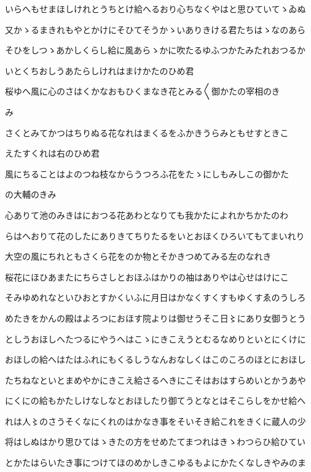 \documentclass[a4paper,11pt,landscape]{ltjtarticle}
\begin{document}
いらへもせまほしけれとうちとけ給へるおり心ちなくやはと思ひていてゝゐぬ
\par\medskip
又かゝるまきれもやとかけにそひてそうかゝいありきける君たちはゝなのあら
\par\medskip
そひをしつゝあかしくらし給に風あらゝかに吹たるゆふつかたみたれおつるか
\par\medskip
いとくちおしうあたらしけれはまけかたのひめ君
\par\medskip
桜ゆへ風に心のさはくかなおもひくまなき花とみる〱御かたの宰相のき
\par\medskip
み
\par\medskip
さくとみてかつはちりぬる花なれはまくるをふかきうらみともせすときこ
\par\medskip
えたすくれは右のひめ君
\par\medskip
風にちることはよのつね枝なからうつろふ花をたゝにしもみしこの御かた
\par\medskip
の大輔のきみ
\par\medskip
心ありて池のみきはにおつる花あわとなりても我かたによれかちかたのわ
\par\medskip
らはへおりて花のしたにありきてちりたるをいとおほくひろいてもてまいれり
\par\medskip
大空の風にちれともさくら花をのか物とそかきつめてみる左のなれき
\par\medskip
桜花にほひあまたにちらさしとおほふはかりの袖はありやは心せはけにこ
\par\medskip
そみゆめれなといひおとすかくいふに月日はかなくすくすもゆくすゑのうしろ
\par\medskip
めたきをかんの殿はよろつにおほす院よりは御せうそこ日〻にあり女御うとう
\par\medskip
としうおほしへたつるにやうへはこゝにきこえうとむるなめりといとにくけに
\par\medskip
おほしの給へはたはふれにもくるしうなんおなしくはこのころのほとにおほし
\par\medskip
たちねなといとまめやかにきこえ給さるへきにこそはおはすらめいとかうあや
\par\medskip
にくにの給もかたしけなしなとおほしたり御てうとなとはそこらしをかせ給へ
\par\medskip
れは人〻のさうそくなにくれのはかなき事をそいそき給これをきくに蔵人の少
\par\medskip
将はしぬはかり思ひてはゝきたの方をせめたてまつれはきゝわつらひ給ひてい
\par\medskip
とかたはらいたき事につけてほのめかしきこゆるもよにかたくなしきやみのま
\par\medskip
\end{document}
